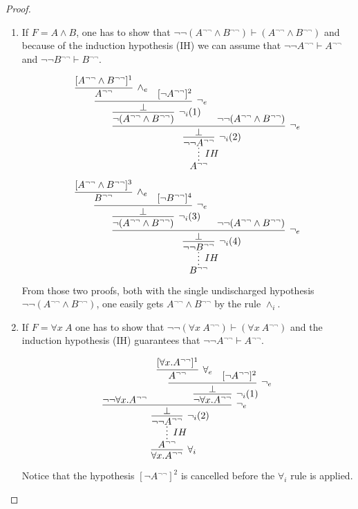 \documentclass[english]{smfart}
\theoremstyle{plain}
\begin{document}
\begin{proof}
\begin{enumerate}
\item If $F=A \land B$, one has to show that $ \lnot\lnot (A{^{\lnot\lnot}} \land B{^{\lnot\lnot}}){\vdash} (A{^{\lnot\lnot}} \land B{^{\lnot\lnot}})$ and because of the induction hypothesis (IH) we can assume that 
$\lnot\lnot A{^{\lnot\lnot}} {\vdash} A{^{\lnot\lnot}}$ and $\lnot\lnot B{^{\lnot\lnot}} {\vdash} B{^{\lnot\lnot}}$. 

$$   \infer*[IH]{A{^{\lnot\lnot}}}{
      \infer[\lnot_i(2)]{\lnot\lnot A{^{\lnot\lnot}}}{
          \infer[\lnot_e]{\bot}{
             \infer[\lnot_i(1)]{\lnot (A{^{\lnot\lnot}} \land B{^{\lnot\lnot}})}{
                \infer[\lnot_e]{\bot}{
                   \infer[\land_e]{A{^{\lnot\lnot}}}{[A{^{\lnot\lnot}} \land B{^{\lnot\lnot}}]^1}
                 & [\lnot A{^{\lnot\lnot}}]^2
                }
             }
           & \lnot\lnot (A{^{\lnot\lnot}} \land B{^{\lnot\lnot}})
          }
      }
   }
   $$
   
 
 \vspace{-5ex} 
 
$$\infer*[IH]{B{^{\lnot\lnot}}}{
      \infer[\lnot_i(4)]{\lnot\lnot B{^{\lnot\lnot}}}{
          \infer[\lnot_e]{\bot}{
             \infer[\lnot_i(3)]{\lnot (A{^{\lnot\lnot}} \land B{^{\lnot\lnot}})}{
                \infer[\lnot_e]{\bot}{
                   \infer[\land_e]{B{^{\lnot\lnot}}}{[A{^{\lnot\lnot}} \land B{^{\lnot\lnot}}]^3}
                 & [\lnot B{^{\lnot\lnot}}]^4
                }
             }
           & \lnot\lnot (A{^{\lnot\lnot}} \land B{^{\lnot\lnot}})
          }
      }
   }
   $$
  

\noindent From those two proofs, both with the single undischarged hypothesis\linebreak $\lnot\lnot (A{^{\lnot\lnot}} \land B{^{\lnot\lnot}})$, one easily gets $A{^{\lnot\lnot}} \land B{^{\lnot\lnot}}$ by the rule $\land_i$. \medskip 

\item If $F=\forall x\ A$
one has to show that $\lnot\lnot (\forall x\ A{^{\lnot\lnot}}){\vdash} (\forall x\ A{^{\lnot\lnot}})$ and the induction hypothesis (IH) guarantees  that
$\lnot\lnot A{^{\lnot\lnot}} {\vdash} A{^{\lnot\lnot}}$. 

$$
\infer[\forall_i]{\forall x. A{^{\lnot\lnot}}}{
   \infer*[IH]{A{^{\lnot\lnot}}}{
      \infer[\lnot_i(2)]{\lnot\lnot A{^{\lnot\lnot}}}{
         \infer[\lnot_e]{\bot}{
            \lnot\lnot \forall x.A{^{\lnot\lnot}}
          & \infer[\lnot_i(1)]{\lnot \forall x.A{^{\lnot\lnot}}}{
               \infer[\lnot_e]{\bot}{
                  \infer[\forall_e]{A{^{\lnot\lnot}}}{[\forall x. A{^{\lnot\lnot}}]^1}
                & [\lnot A{^{\lnot\lnot}}]^2
               }
            }
          }  
      }
   }
}
$$

\noindent Notice that the hypothesis  $[\lnot A{^{\lnot\lnot}}]^2$ is cancelled before the $\forall_i$ rule is applied. 
\end{enumerate} 
\end{proof} 
\end{document}
